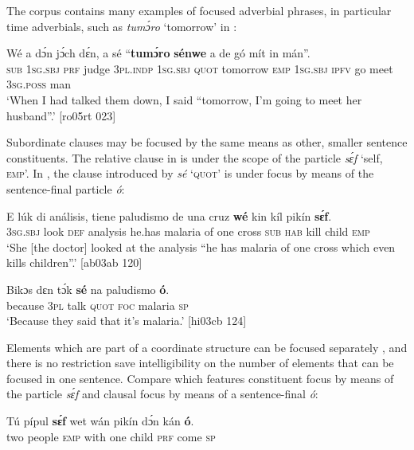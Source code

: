 The corpus contains many examples of focused adverbial phrases, in particular time adverbials, such as \textit{tumɔ́ro} ‘tomorrow’ in :


\ea%
    \label{ex:key:676}
    \gll Wé  a    dɔ́n  jɔ́ch    dɛ́n,    a    sé    “\textbf{tumɔ́ro}    \textbf{sénwe}
a    de  gó  mít    in    mán”.\\
\textsc{sub}  \textsc{1sg.sbj}  \textsc{prf}  judge  \textsc{3pl.indp}  \textsc{1sg.sbj}  \textsc{quot}    \phantom{“}tomorrow  \textsc{emp}
\textsc{1sg.sbj}  \textsc{ipfv}  go  meet  \textsc{3sg.poss}  man\\

\glt ‘When I had talked them down, I said “tomorrow, I’m going to meet 
her husband”.’ [ro05rt 023]
\z

Subordinate clauses may be focused by the same means as other, smaller sentence constituents. The relative clause{\fff} in  is under the scope of the particle \textit{sɛ́f} ‘self, \textsc{emp}’. In , the clause introduced by \textit{sé} ‘\textsc{quot}’ is under focus by means of the sentence-final particle \textit{ó}:


\ea%
    \label{ex:key:677}
\gll
E    lúk    di  análisis,  tiene  paludismo  de  una  cruz
\textbf{wé}  kin  kíl  pikín  \textbf{sɛ́f}.\\
\textsc{3sg.sbj}  look    \textsc{def}  analysis  he.has  malaria    of  one  cross
\textsc{sub}  \textsc{hab}  kill  child  \textsc{emp}\\

\glt ‘She [the doctor] looked at the analysis “he has malaria of one cross 
which even kills children”.’ [ab03ab 120]
\z


\ea%
    \label{ex:key:678}
    \gll Bikɔs  dɛn  tɔ́k  \textbf{sé}  na  paludismo  \textbf{ó}.\\
because  \textsc{3pl}  talk  \textsc{quot}  \textsc{foc}  malaria    \textsc{sp}\\

\glt ‘Because they said that it’s malaria.’ [hi03cb 124]
\z

Elements which are part of a coordinate structure can be focused separately , and there is no restriction save intelligibility on the number of elements that can be focused in one sentence. Compare  which features constituent focus by means of the particle \textit{sɛ́f} and clausal focus by means of a sentence-final \textit{ó}:


\ea%
    \label{ex:key:679}
    \gll Tú  pípul  \textbf{sɛ́f}  wet  wán  pikín  dɔ́n  kán    \textbf{ó}.\\
two  people  \textsc{emp}  with  one  child  \textsc{prf}  come  \textsc{sp}\\

